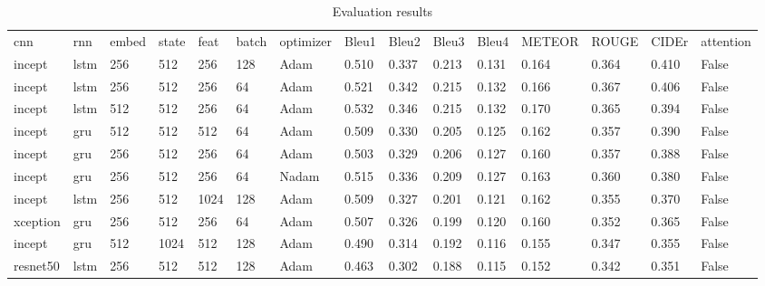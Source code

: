 \begin{table}[]
\caption{Evaluation results}
\label{tab:results}
\begin{tabular}{lllllllllllllll}
cnn & rnn & embed & state & feat & batch & optimizer & Bleu1 & Bleu2 & Bleu3 & Bleu4 & METEOR & ROUGE & CIDEr & attention \\
incept & lstm & 256 & 512 & 256 & 128 & Adam & 0.510 & 0.337 & 0.213 & 0.131 & 0.164 & 0.364 & 0.410 & False \\
incept & lstm & 256 & 512 & 256 & 64 & Adam & 0.521 & 0.342 & 0.215 & 0.132 & 0.166 & 0.367 & 0.406 & False \\
incept & lstm & 512 & 512 & 256 & 64 & Adam & 0.532 & 0.346 & 0.215 & 0.132 & 0.170 & 0.365 & 0.394 & False \\
incept & gru & 512 & 512 & 512 & 64 & Adam & 0.509 & 0.330 & 0.205 & 0.125 & 0.162 & 0.357 & 0.390 & False \\
incept & gru & 256 & 512 & 256 & 64 & Adam & 0.503 & 0.329 & 0.206 & 0.127 & 0.160 & 0.357 & 0.388 & False \\
incept & gru & 256 & 512 & 256 & 64 & Nadam & 0.515 & 0.336 & 0.209 & 0.127 & 0.163 & 0.360 & 0.380 & False \\
incept & lstm & 256 & 512 & 1024 & 128 & Adam & 0.509 & 0.327 & 0.201 & 0.121 & 0.162 & 0.355 & 0.370 & False \\
xception & gru & 256 & 512 & 256 & 64 & Adam & 0.507 & 0.326 & 0.199 & 0.120 & 0.160 & 0.352 & 0.365 & False \\
incept & gru & 512 & 1024 & 512 & 128 & Adam & 0.490 & 0.314 & 0.192 & 0.116 & 0.155 & 0.347 & 0.355 & False \\
resnet50 & lstm & 256 & 512 & 512 & 128 & Adam & 0.463 & 0.302 & 0.188 & 0.115 & 0.152 & 0.342 & 0.351 & False
\end{tabular}
\end{table}







